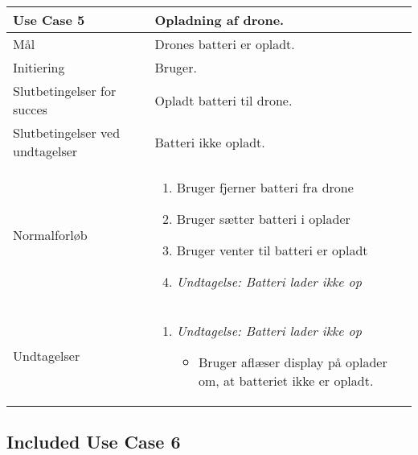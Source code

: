 \documentclass[Main]{subfiles}
\begin{document}
\begin{longtable}{|p{}|p{}|}
\hline
Use Case 5 	& 
Opladning af drone. \\ \hline

Mål 		& 
Drones batteri er opladt. \\ \hline

Initiering	& 
Bruger. \\ \hline

Slutbetingelser for succes & 
Opladt batteri til drone.  \\ \hline

Slutbetingelser ved undtagelser & 
Batteri ikke opladt. \\ \hline

Normalforløb &	\vspace{-8mm}
	\begin{enumerate}[noitemsep,nolistsep,leftmargin=*]
	\item Bruger fjerner batteri fra drone
	\item Bruger sætter batteri i oplader
	\item Bruger venter til batteri er opladt
	\item[]	\textit{Undtagelse: Batteri lader ikke op}
	\end{enumerate} \\ \hline

Undtagelser & \vspace{-8mm}
	\begin{enumerate}[noitemsep,nolistsep,leftmargin=*]
	\item[] \textit{Undtagelse: Batteri lader ikke op}
		\begin{itemize}[noitemsep,nolistsep]
		\item Bruger aflæser display på oplader om, at batteriet ikke er opladt.
		\end{itemize}
	\end{enumerate}\\
\hline
\end{longtable}



\subsection{Included Use Case 6}\label{UC:extend}
\end{document}
